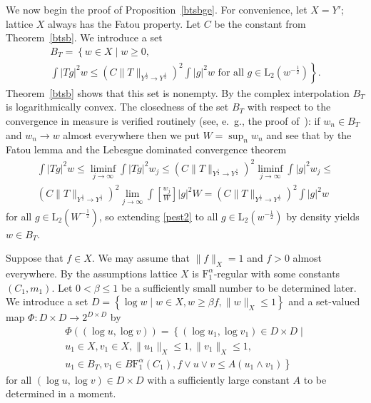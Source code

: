 \documentclass[12pt]{amsart}
\newcommand {\frclass} [2] {\ensuremath{\mathrm F^{#1}_{#2}}}
\newcommand {\lclass} [2] {\ensuremath{\mathrm L_{#1} \left( #2 \right) }}
\newcommand {\weightu} {\ensuremath {\mathit u}}
\newcommand {\weightv} {\ensuremath {\mathit v}}
\newcommand {\weightw} {\ensuremath {\mathit w}}
\newcommand {\fbab} [3] {\ensuremath {B\frclass {#1} {#2} \left(#3\right)}}
\begin{document}
We now begin the proof of Proposition~\ref {btsbge}.
For convenience, let $X = Y'$; lattice $X$ always has the Fatou property.
Let $C$ be the constant from Theorem~\ref {btsb}.  We introduce a set
\begin {multline*}
B_T = \left\{ \weightw \in X \mid \weightw \geqslant 0, \right.
\\
\left.
\int |T g|^2 \weightw \leqslant
\left(C \|T\|_{Y^{\frac 1 2} \to Y^{\frac 1 2}}\right)^2
\int |g|^2 \weightw \text { for all $g \in \lclass {2} {\weightw^{-\frac 1 2}}$} \right\}.
\end {multline*}
Theorem~\ref {btsb} shows that this set is nonempty.
By the complex interpolation $B_T$ is logarithmically convex.  The closedness of the set $B_T$
with respect to the convergence in measure is verified routinely
(see, e.~g., the proof of~\cite [Proposition~16] {rutsky2011en}):
if $\weightw_n \in B_T$ and $\weightw_n \to \weightw$ almost everywhere then
we put $W = \sup_n \weightw_n$ and see that by the Fatou lemma and the Lebesgue dominated convergence theorem
\begin {multline}
\label {pest2}
\int |T g|^2 \weightw \leqslant
\liminf_{j \to \infty} \int |T g|^2 \weightw_j \leqslant
\left(C \|T\|_{Y^{\frac 1 2} \to Y^{\frac 1 2}}\right)^2 \liminf_{j \to \infty} \int |g|^2 \weightw_j \leqslant
\\
\left(C \|T\|_{Y^{\frac 1 2} \to Y^{\frac 1 2}}\right)^2
\lim_{j \to \infty}
\int \left[ \frac {\weightw_j} {W} \right] |g|^2 W =
\left(C \|T\|_{Y^{\frac 1 2} \to Y^{\frac 1 2}}\right)^2 \int |g|^2 \weightw
\end {multline}
for all $g \in \lclass {2} {W^{-\frac 1 2}}$, so extending
\eqref {pest2} to all $g \in \lclass {2} {\weightw^{-\frac 1 2}}$ by density yields $\weightw \in B_T$.

{}

Suppose that $f \in X$.  We may assume that $\|f\|_X = 1$ and $f > 0$ almost everywhere.
By the assumptions lattice $X$ is $\frclass {\alpha} {1}$-regular with some constants $(C_1, m_1)$.
Let $0 < \beta \leqslant 1$ be a sufficiently small number to be determined later.
We introduce a set $D = \left\{\log \weightw \mid \weightw \in X, \weightw \geqslant \beta f,
\|\weightw\|_X \leqslant 1 \right\}$
and a set-valued map $\Phi : D \times D \to 2^{D \times D}$
by
\begin {multline*}
\Phi ((\log \weightu, \log \weightv)) = \left\{(\log \weightu_1, \log \weightv_1) \in D \times D \mid \right.
\\
\weightu_1 \in X, \weightv_1 \in X, \|\weightu_1\|_X \leqslant 1, \|\weightv_1\|_X \leqslant 1,
\\
\left.
\weightu_1 \in B_T,
\weightv_1 \in \fbab {\alpha} {1} {C_1},
f \vee \weightu \vee \weightv \leqslant A (\weightu_1 \wedge \weightv_1)
\right\}
\end {multline*}
for all $(\log \weightu, \log \weightv) \in D \times D$
with a sufficiently large constant $A$ to be determined in a moment.
\end{document}
